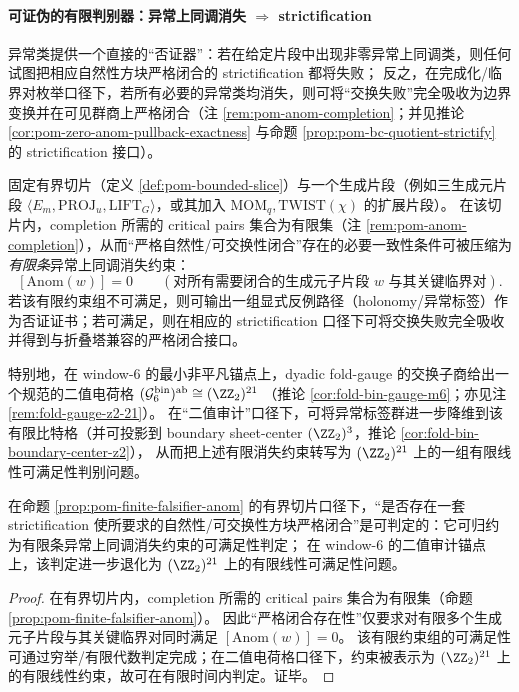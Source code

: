 \paragraph{可证伪的有限判别器：异常上同调消失 \texorpdfstring{$\Rightarrow$}{=>} strictification}
异常类提供一个直接的“否证器”：若在给定片段中出现非零异常上同调类，则任何试图把相应自然性方块严格闭合的 strictification 都将失败；
反之，在完成化/临界对枚举口径下，若所有必要的异常类均消失，则可将“交换失败”完全吸收为边界变换并在可见群商上严格闭合（注 \ref{rem:pom-anom-completion}；并见推论 \ref{cor:pom-zero-anom-pullback-exactness} 与命题 \ref{prop:pom-bc-quotient-strictify} 的 strictification 接口）。

\begin{proposition}\label{prop:pom-finite-falsifier-anom}
固定有界切片（定义 \ref{def:pom-bounded-slice}）与一个生成片段（例如三生成元片段 \(\langle E_m,\mathrm{PROJ}_u,\mathrm{LIFT}_G\rangle\)，或其加入 \(\mathrm{MOM}_q,\mathrm{TWIST}(\chi)\) 的扩展片段）。
在该切片内，completion 所需的 critical pairs 集合为有限集（注 \ref{rem:pom-anom-completion}），从而“严格自然性/可交换性闭合”存在的必要一致性条件可被压缩为\emph{有限条}异常上同调消失约束：
\[
[\mathrm{Anom}(w)] = 0\qquad(\text{对所有需要闭合的生成元子片段 }w\text{ 与其关键临界对}).
\]
若该有限约束组不可满足，则可输出一组显式反例路径（holonomy/异常标签）作为否证证书；若可满足，则在相应的 strictification 口径下可将交换失败完全吸收并得到与折叠塔兼容的严格闭合接口。
\par
特别地，在 window-\(6\) 的最小非平凡锚点上，dyadic fold-gauge 的交换子商给出一个规范的二值电荷格
\(
(\mathcal{G}^{\mathrm{bin}}_6)^{\mathrm{ab}}\cong (\ZZ_2)^{21}
\)
（推论 \ref{cor:fold-bin-gauge-m6}；亦见注 \ref{rem:fold-gauge-z2-21}）。
在“二值审计”口径下，可将异常标签群进一步降维到该有限比特格（并可投影到 boundary sheet-center \((\ZZ_2)^3\)，推论 \ref{cor:fold-bin-boundary-center-z2}），
从而把上述有限消失约束转写为 \((\ZZ_2)^{21}\) 上的一组有限线性可满足性判别问题。
\end{proposition}

\begin{corollary}\label{cor:pom-strictification-existence-decidable-bounded-slice}
在命题 \ref{prop:pom-finite-falsifier-anom} 的有界切片口径下，“是否存在一套 strictification 使所要求的自然性/可交换性方块严格闭合”是可判定的：它可归约为有限条异常上同调消失约束的可满足性判定；
在 window-\(6\) 的二值审计锚点上，该判定进一步退化为 \((\ZZ_2)^{21}\) 上的有限线性可满足性问题。
\end{corollary}
\begin{proof}
在有界切片内，completion 所需的 critical pairs 集合为有限集（命题 \ref{prop:pom-finite-falsifier-anom}）。
因此“严格闭合存在性”仅要求对有限多个生成元子片段与其关键临界对同时满足 \([\mathrm{Anom}(w)]=0\)。
该有限约束组的可满足性可通过穷举/有限代数判定完成；在二值电荷格口径下，约束被表示为 \((\ZZ_2)^{21}\) 上的有限线性约束，故可在有限时间内判定。证毕。
\end{proof}


